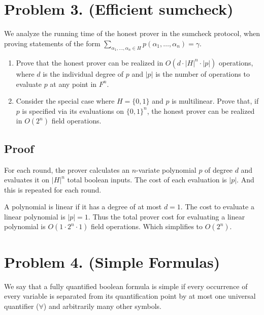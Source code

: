 \documentclass{article}
\begin{document}
\section*{Problem 3. (Efficient sumcheck)}

We analyze the running time of the honest prover in the sumcheck protocol, when proving statements of the form $\sum_{\alpha_1,\ldots,\alpha_n \in H} p(\alpha_1, \ldots, \alpha_n) = \gamma$.

\begin{enumerate}
    \item Prove that the honest prover can be realized in $O(d \cdot |H|^n \cdot |p|)$ operations, where $d$ is the individual degree of $p$ and $|p|$ is the number of operations to evaluate $p$ at any point in $F^n$.
    \item Consider the special case where $H = \{0, 1\}$ and $p$ is multilinear. Prove that, if $p$ is specified via its evaluations on $\{0, 1\}^n$, the honest prover can be realized in $O(2^n)$ field operations.
\end{enumerate}

\subsection{Proof}

For each round, the prover calculates an $n$-variate polynomial $p$ of degree $d$ and evaluates it on $|H|^{n}$ total boolean inputs.  The cost of each evaluation is $|p|$.  And this is repeated for each round.

A polynomial is linear if it has a degree of at most $d=1$.  The cost to evaluate a linear polynomial is $|p|=1$.  Thus the total prover cost for evaluating a linear polynomial is $O(1 \cdot 2^{n} \cdot 1)$ field operations. Which simplifies to $O(2^{n})$.


\section*{Problem 4. (Simple Formulas)}

We say that a fully quantified boolean formula is simple if every occurrence of every variable is separated from its quantification point by at most one universal quantifier ($\forall$) and arbitrarily many other symbols.
\end{document}
